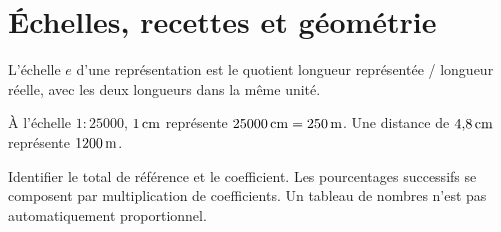 \documentclass[../cours_3e.tex]{subfiles}
\begin{document}
\section{Échelles, recettes et géométrie}
\begin{definition}
L'échelle $e$ d'une représentation est le quotient longueur représentée / longueur réelle, avec les deux longueurs dans la même unité.
\end{definition}
À l'échelle $1:25000$, $1\,\mathrm{cm}$ représente $25000\,\mathrm{cm}=250\,\mathrm{m}$. Une distance de $4{,}8\,\mathrm{cm}$ représente $1200\,\mathrm{m}$.
\begin{retenir}
Identifier le total de référence et le coefficient. Les pourcentages successifs se composent par multiplication de coefficients. Un tableau de nombres n'est pas automatiquement proportionnel.
\end{retenir}
\end{document}
